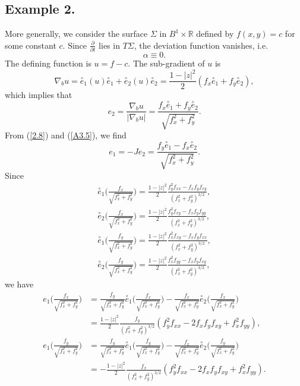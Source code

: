 \documentclass{amsart}
\theoremstyle{Corollary}
\numberwithin{equation}{section}
\begin{document}
\subsection{Example 2.}
More generally, we consider the surface $\Sigma$ in $B^1\times\mathbb{R}$ 
defined by $f(x,y)=c$ for some constant $c$. 
Since $\frac{\partial}{\partial t}$ lies in $T\Sigma$, 
the deviation function vanishes, i.e.
\begin{equation}\label{A3.4}
\alpha\equiv 0.
\end{equation} 
The defining function is 
$u=f-c$. 
The sub-gradient of $u$ is 
\begin{equation*}
\nabla_b u=\overset{\circ}{e}_1(u) \overset{\circ}{e}_1+\overset{\circ}{e}_2(u) \overset{\circ}{e}_2
=\frac{1-|z|^2}{2}(f_x\overset{\circ}{e}_1+f_y\overset{\circ}{e}_2),
\end{equation*}
which implies that 
\begin{equation}\label{A3.5}
e_2=\frac{\nabla_b u}{|\nabla_b u|}
=\frac{f_x\overset{\circ}{e}_1+f_y\overset{\circ}{e}_2}{\sqrt{f_x^2+f_y^2}}.
\end{equation}
From (\ref{2.8}) and (\ref{A3.5}), we find 
\begin{equation}\label{A3.6}
e_1=-Je_2=\frac{f_y\overset{\circ}{e}_1-f_x\overset{\circ}{e}_2}{\sqrt{f_x^2+f_y^2}}.
\end{equation}
Since 
\begin{align*}
\overset{\circ}{e}_1\Bigg(\frac{f_x}{\sqrt{f_x^2+f_y^2}}\Bigg)=\frac{1-|z|^2}{2}\frac{f_y^2f_{xx}-f_xf_yf_{xy}}{(f_x^2+f_y^2)^{3/2}},\\
\overset{\circ}{e}_2\Bigg(\frac{f_x}{\sqrt{f_x^2+f_y^2}}\Bigg)=\frac{1-|z|^2}{2}\frac{f_y^2f_{xy}-f_xf_yf_{yy}}{(f_x^2+f_y^2)^{3/2}},\\
\overset{\circ}{e}_1\Bigg(\frac{f_y}{\sqrt{f_x^2+f_y^2}}\Bigg)=\frac{1-|z|^2}{2}\frac{f_x^2f_{xy}-f_xf_yf_{xx}}{(f_x^2+f_y^2)^{3/2}},\\
\overset{\circ}{e}_2\Bigg(\frac{f_y}{\sqrt{f_x^2+f_y^2}}\Bigg)=\frac{1-|z|^2}{2}\frac{f_x^2f_{yy}-f_xf_yf_{xy}}{(f_x^2+f_y^2)^{3/2}},
\end{align*}
we have
\begin{equation}\label{A3.7}
\begin{split}
e_1\Bigg(\frac{f_x}{\sqrt{f_x^2+f_y^2}}\Bigg)
&= \frac{f_y}{\sqrt{f_x^2+f_y^2}} \overset{\circ}{e}_1\Bigg(\frac{f_x}{\sqrt{f_x^2+f_y^2}}\Bigg)
- \frac{f_x}{\sqrt{f_x^2+f_y^2}} \overset{\circ}{e}_2\Bigg(\frac{f_x}{\sqrt{f_x^2+f_y^2}}\Bigg)\\
&=\frac{1-|z|^2}{2}\frac{f_y}{(f_x^2+f_y^2)^{3/2}}(f_y^2f_{xx}-2f_xf_y f_{xy}+f_x^2 f_{yy}),\\
e_1\Bigg(\frac{f_y}{\sqrt{f_x^2+f_y^2}}\Bigg)
&= \frac{f_y}{\sqrt{f_x^2+f_y^2}} \overset{\circ}{e}_1\Bigg(\frac{f_y}{\sqrt{f_x^2+f_y^2}}\Bigg)
- \frac{f_x}{\sqrt{f_x^2+f_y^2}} \overset{\circ}{e}_2\Bigg(\frac{f_y}{\sqrt{f_x^2+f_y^2}}\Bigg)\\
&=-\frac{1-|z|^2}{2}\frac{f_x}{(f_x^2+f_y^2)^{3/2}}(f_y^2f_{xx}-2f_xf_y f_{xy}+f_x^2 f_{yy}).
\end{split}
\end{equation} 
\end{document}
